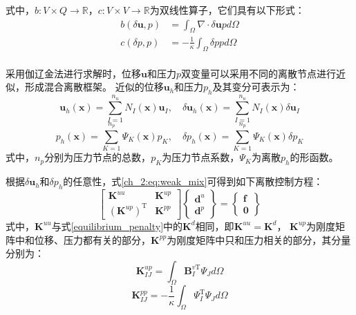式中，$b: V\times Q\rightarrow \mathbb R$，$c: V\times V\rightarrow \mathbb R$为双线性算子，它们具有以下形式：
\begin{align}
    b(\delta \boldsymbol u, p) &= \int_\Omega \nabla \cdot \delta \boldsymbol u p d\Omega \\
    c(\delta p,p) &= -\frac{1}{\kappa}\int_\Omega\delta p p d\Omega \\
\end{align}

采用伽辽金法进行求解时，位移$\boldsymbol u$和压力$p$双变量可以采用不同的离散节点进行近似，形成混合离散框架。
近似的位移$\boldsymbol u_h$和压力$p_h$及其变分可表示为：
\begin{equation}\label{ch_2:eq:u_h_mix}
    \boldsymbol u_h(\boldsymbol x) = \sum_{I=1}^{n_u} N_I(\boldsymbol x) \boldsymbol u_I, \quad
    \delta \boldsymbol u_h(\boldsymbol x) = \sum_{I=1}^{n_u} N_I(\boldsymbol x) \delta \boldsymbol u_I
\end{equation}
\begin{equation}\label{ch_2:eq:p_h_mix}
    p_h(\boldsymbol x) = \sum_{K=1}^{n_p} \Psi_K(\boldsymbol x) p_K, \quad
    \delta p_h(\boldsymbol x) = \sum_{K=1}^{n_p} \Psi_K(\boldsymbol x) \delta p_K
\end{equation}
式中，$n_p$分别为压力节点的总数，$p_K$为压力节点系数，$\Psi_K$为离散$p_h$的形函数。

根据$\delta \boldsymbol  u_h$和$\delta p_h$的任意性，式\eqref{ch_2:eq:weak_mix}可得到如下离散控制方程：
\begin{equation}\label{ch_2:eq:equilibrium_mix}
    \begin{bmatrix}
        \boldsymbol K^{uu} & \boldsymbol K^{up} \\ (\boldsymbol K^{up})^{\mathrm T} & \boldsymbol K^{pp}
    \end{bmatrix}
    \begin{Bmatrix}
        \boldsymbol d^u \\ \boldsymbol d^p 
    \end{Bmatrix} =
    \begin{Bmatrix}
        \boldsymbol f \\ \boldsymbol 0 
    \end{Bmatrix}
\end{equation}
式中，$\boldsymbol K^{uu}$与式\eqref{equilibrium_penalty}中的$\boldsymbol K^d$相同，即$\boldsymbol K^{uu} = \boldsymbol K^d$， $\boldsymbol{K}^{up}$为刚度矩阵中和位移、压力都有关的部分，$\boldsymbol{K}^{pp}$为刚度矩阵中只和压力相关的部分，其分量分别为：
\begin{equation}
    \boldsymbol{K}^{up}_{I J}=\int_{\Omega} \boldsymbol B_{I}^{v\mathrm T} \Psi_{J} {d} \Omega
\end{equation}
\begin{equation}  \label{ch_2:eq:equilibrium_pp}
    \boldsymbol{K}^{pp}_{IJ}=-\frac{1}{\kappa}\int_{\Omega}  \Psi^\mathrm{T}_{I}  \Psi_{J}d\Omega
\end{equation}

